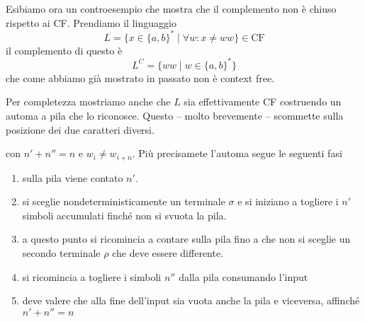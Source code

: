\documentclass[12pt]{report}
\theoremstyle{definition}
\theoremstyle{regard}
\begin{document}
\begin{tcolorbox}[breakable]
	Esibiamo ora un controesempio che mostra che il complemento non è chiuso rispetto ai CF.
	Prendiamo il linguaggio
	$$ L = \{ x \in \{a, b\}^* \mid \forall w : x \neq w w \} \in \text{CF} $$
	il complemento di questo è
	$$ L^C = \{ w w \mid w \in \{a, b\}^* \} $$
	che come abbiamo già mostrato in passato non è context free.	%

	Per completezza mostriamo anche che $L$ sia effettivamente CF costruendo un automa a pila che lo riconosce.
	Questo -- molto brevemente -- scommette sulla posizione dei due caratteri diversi.
	\begin{center}
	\end{center}
	con $n' + n'' = n$ e $w_i \neq w_{i + n}$.
	Più precisamete l'automa segue le seguenti fasi
	\begin{enumerate}
		\item sulla pila viene contato $n'$.
		\item si sceglie nondeterministicamente un terminale $\sigma$ e si iniziano a togliere i $n'$ simboli accumulati finché non si svuota la pila.
		\item a questo punto si ricomincia a contare sulla pila fino a che non si sceglie un secondo terminale $\rho$ che deve essere differente.
		\item si ricomincia a togliere i simboli $n''$ dalla pila consumando l'input
		\item deve valere che alla fine dell'input sia vuota anche la pila e viceversa, affinché $n' + n'' = n$
	\end{enumerate}
\end{tcolorbox}
\end{document}
